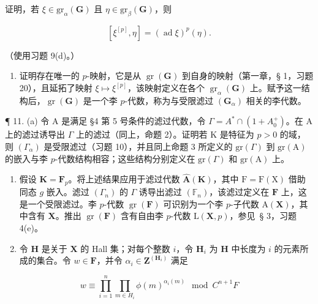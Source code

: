 证明，若 \(\xi \in \mathrm{gr}_{\alpha}(\mathbf{G})\) 且 \(\eta \in \mathrm{gr}_{\beta}(\mathbf{G})\)，则

\[
[ \xi^ {[ p ]}, \eta ] = (\operatorname{ad} \xi) ^ {p} (\eta).
\]

（使用习题 9(d)。）

\begin{enumerate}
\def\labelenumi{(\alph{enumi})}
\setcounter{enumi}{2}
\tightlist
\item
  证明存在唯一的 \(p\)-映射，它是从 \(\operatorname{gr}(\mathbf{G})\) 到自身的映射（第一章，§ 1，习题 20），且延拓了映射 \(\xi \mapsto \xi^{[p]}\)，该映射定义在各个 \(\operatorname{gr}_{\alpha}(\mathbf{G})\) 上。赋予这一结构后，\(\operatorname{gr}(\mathbf{G})\) 是一个李 \(p\)-代数，称为与受限滤过 \((\mathbf{G}_{\alpha})\) 相关的李代数。
\end{enumerate}

¶ 11. (a) 令 A 是满足 §4 第 5 号条件的滤过代数，令 \(\Gamma = A^{*} \cap (1 + A_{0}^{+})\)。在 A 上的滤过诱导出 \(\Gamma\) 上的滤过（同上，命题 2）。证明若 K 是特征为 \(p > 0\) 的域，则 \((\Gamma_{\alpha})\) 是受限滤过（习题 10），并且同上命题 3 所定义的 \(\mathrm{gr}(\Gamma)\) 到 \(\mathrm{gr(A)}\) 的嵌入与李 \(p\)-代数结构相容；这些结构分别定义在 \(\mathrm{gr}(\Gamma)\) 和 \(\mathrm{gr(A)}\) 上。

\begin{enumerate}
\def\labelenumi{(\alph{enumi})}
\setcounter{enumi}{1}
\item
  假设 \(\mathbf{K} = \mathbf{F}_p\)。将上述结果应用于滤过代数 \(\hat{\mathbf{A}}(\mathbf{K})\)，其中 \(\mathrm{F} = \mathrm{F}(\mathrm{X})\) 借助同态 \(g\) 嵌入。滤过 \((\Gamma_n)\) 的 \(\Gamma\) 诱导出滤过 \((\mathbb{F}_n)\)，该滤过定义在 \(\mathbf{F}\) 上，这是一个受限滤过。李 \(p\)-代数 \(\operatorname{gr}(\mathbf{F})\) 可识别为一个李 \(p\)-子代数 \(\mathrm{A}(\mathbf{X})\)，其中含有 \(\mathbf{X}\)。推出 \(\operatorname{gr}(\mathbf{F})\) 含有自由李 \(p\)-代数 \(\mathrm{L}(\mathbf{X}, p)\)，参见~§ 3，习题 4(e)。
\item
  令 \(\mathbf{H}\) 是关于 \(\mathbf{X}\) 的 Hall 集；对每个整数 \(i\)，令 \(\mathbf{H}_i\) 为 \(\mathbf{H}\) 中长度为 \(i\) 的元素所成的集合。令 \(w \in \mathbf{F}\)，并令 \(\alpha_i \in \mathbf{Z}^{(\mathbf{H}_i)}\) 满足
\end{enumerate}

\[
w \equiv \prod_ {i = 1} ^ {n} \prod_ {m \in H_i} \phi (m) ^ {\alpha_ {i} (m)} \mod C ^ {n + 1} F
\]

